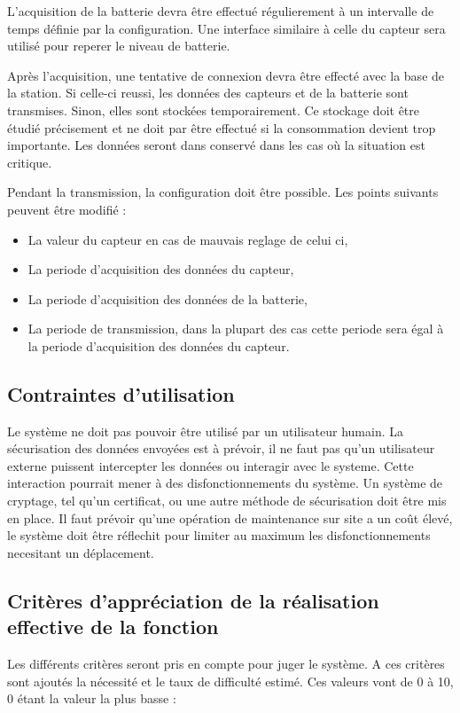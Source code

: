 L'acquisition de la batterie devra être effectué régulierement à un intervalle de temps définie par la configuration. Une interface similaire à celle du capteur sera utilisé pour reperer le niveau de batterie.

Après l'acquisition, une tentative de connexion devra être effecté avec la base de la station. Si celle-ci reussi, les données des capteurs et de la batterie sont transmises. Sinon, elles sont stockées temporairement. Ce stockage doit être étudié précisement et ne doit par être effectué si la consommation devient trop importante. Les données seront dans conservé dans les cas où la situation est critique.  

Pendant la transmission, la configuration doit être possible. Les points suivants peuvent être modifié :
\begin{itemize}
\item La valeur du capteur en cas de mauvais reglage de celui ci,
\item La periode d'acquisition des données du capteur,
\item La periode d'acquisition des données de la batterie,
\item La periode de transmission, dans la plupart des cas cette periode sera égal à la periode d'acquisition des données du capteur. 
\end{itemize}

\subsection{Contraintes d'utilisation}

Le système ne doit pas pouvoir être utilisé par un utilisateur humain. La sécurisation des données envoyées est à prévoir, il ne faut pas qu'un utilisateur externe puissent intercepter les données ou interagir avec le systeme. Cette interaction pourrait mener à des disfonctionnements du système. Un système de cryptage, tel qu'un certificat, ou une autre méthode de sécurisation doit être mis en place.
Il faut prévoir qu'une opération de maintenance sur site a un coût élevé, le système doit être réflechit pour limiter au maximum les disfonctionnements necesitant un déplacement. 

\subsection{Critères d'appréciation de la réalisation effective de la fonction}
Les différents critères seront pris en compte pour juger le système. A ces critères sont ajoutés la nécessité et le taux de difficulté estimé. Ces valeurs vont de 0 à 10, 0 étant la valeur la plus basse :

